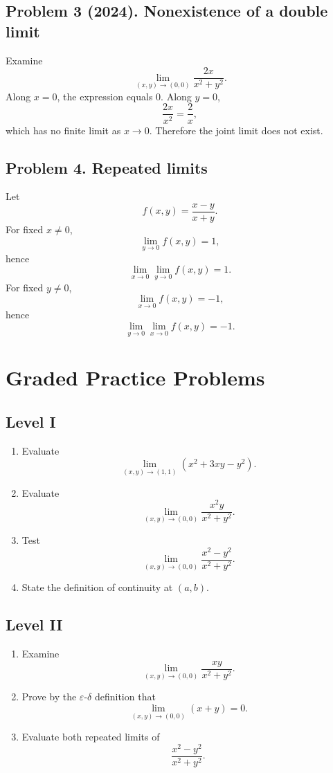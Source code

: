 \documentclass[11pt,oneside]{book}
\theoremstyle{studentthm}
\theoremstyle{definition}
\newcommand{\eps}{\varepsilon}
\begin{document}
\subsection*{Problem 3 (2024). Nonexistence of a double limit}
Examine
\[
\lim_{(x,y)\to(0,0)}
\frac{2x}{x^2+y^2}.
\]
Along \(x=0\), the expression equals \(0\). Along \(y=0\),
\[
\frac{2x}{x^2}=\frac2x,
\]
which has no finite limit as \(x\to0\). Therefore the joint limit
does not exist.

\subsection*{Problem 4. Repeated limits}
Let
\[
f(x,y)=\frac{x-y}{x+y}.
\]
For fixed \(x\ne0\),
\[
\lim_{y\to0}f(x,y)=1,
\]
hence
\[
\lim_{x\to0}\lim_{y\to0}f(x,y)=1.
\]
For fixed \(y\ne0\),
\[
\lim_{x\to0}f(x,y)=-1,
\]
hence
\[
\lim_{y\to0}\lim_{x\to0}f(x,y)=-1.
\]

\section{Graded Practice Problems}

\subsection*{Level I}
\begin{enumerate}
\item Evaluate
\[
\lim_{(x,y)\to(1,1)}(x^2+3xy-y^2).
\]
\item Evaluate
\[
\lim_{(x,y)\to(0,0)}
\frac{x^2y}{x^2+y^2}.
\]
\item Test
\[
\lim_{(x,y)\to(0,0)}
\frac{x^2-y^2}{x^2+y^2}.
\]
\item State the definition of continuity at \((a,b)\).
\end{enumerate}

\subsection*{Level II}
\begin{enumerate}
\item Examine
\[
\lim_{(x,y)\to(0,0)}
\frac{xy}{x^2+y^2}.
\]
\item Prove by the \(\eps\)-\(\delta\) definition that
\[
\lim_{(x,y)\to(0,0)}(x+y)=0.
\]
\item Evaluate both repeated limits of
\[
\frac{x^2-y^2}{x^2+y^2}.
\]
\end{enumerate}
\end{document}
